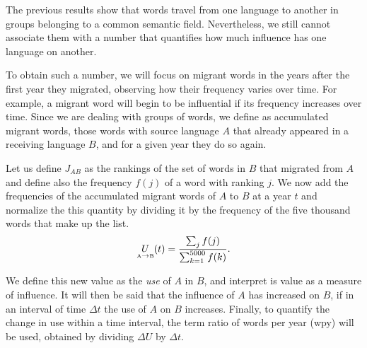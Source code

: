 \documentclass[10pt,letterpaper]{article} %
\begin{document}
The previous results show that words travel from one language to another in
groups belonging to a common semantic field. Nevertheless, we still cannot
associate them with a number that quantifies how much influence has one
language on another.

To obtain such a number, we will focus on migrant words in the years after the
first year they migrated, observing how their frequency varies over time. For
example, a migrant word will begin to be influential if its frequency increases
over time. Since we are dealing with groups of words, we define as accumulated
migrant words, those words with source language $A$ that already appeared in a
receiving language $B$, and for a given year they do so again.

Let us define $J_{AB}$ as the rankings of the set of words in $B$ that migrated
from $A$ and define also the frequency $f(j)$ of a word with ranking $j$. We now
add the frequencies of the accumulated
migrant words of $A$ to $B$ at a year $t$ and normalize the this quantity by
dividing it by the frequency of the five thousand words that make up the list.
\begin{equation}
\label{ec.fuso}
\underset{ \text{\tiny A} \to  \text{\tiny B} }{U}(t) = \frac{\sum_{j}
f(j)}{\sum_{k=1}^{5000} f(k)}.
\end{equation}



% 
We define this new value as the \textit{use} of $A$ in $B$, and interpret is value
as a measure of influence. It will then be said that the influence of $A$ has increased on
$B$, if in an interval of time $\Delta t$ the use of $A$ on $B$ increases.
Finally, to quantify the change in use within a time interval, the term ratio
of words per year (wpy) will be used, obtained by dividing $\Delta U$  by
$\Delta t$.
\end{document}
